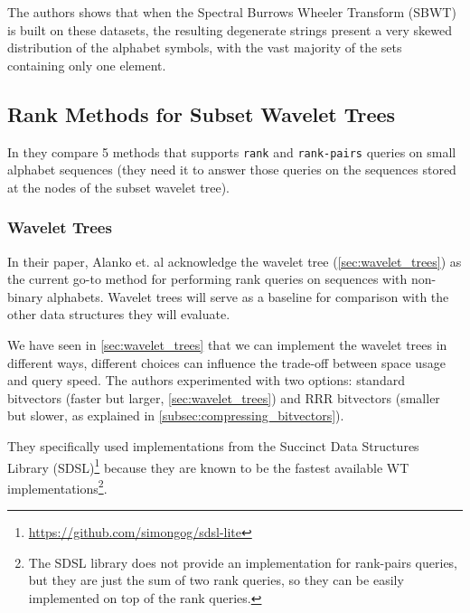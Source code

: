 \noindent The authors shows that when the Spectral Burrows Wheeler Transform (SBWT) is built on these datasets, the resulting degenerate strings present a very skewed distribution of the alphabet symbols, with the vast majority of the sets containing only one element.

\subsection{Rank Methods for Subset Wavelet Trees} \label{sec:rank_succint_datastructures}
In \cite{SubsetWT} they compare 5 methods that supports \texttt{rank} and \texttt{rank-pairs} queries on small alphabet sequences (they need it to answer those queries on the sequences stored at the nodes of the subset wavelet tree).

\subsubsection{Wavelet Trees}

In their paper, Alanko et. al acknowledge the wavelet tree (\autoref{sec:wavelet_trees}) as the current go-to method for performing rank queries on sequences with non-binary alphabets. Wavelet trees will serve as a baseline for comparison with the other data structures they will evaluate. \vspace{0.4cm}

\noindent We have seen in \autoref{sec:wavelet_trees} that we can implement the wavelet trees in different ways, different choices can influence the trade-off between space usage and query speed. The authors experimented with two options: standard bitvectors (faster but larger, \autoref{sec:wavelet_trees}) and RRR bitvectors (smaller but slower, as explained in \autoref{subsec:compressing_bitvectors}). \vspace{0.4cm}

\noindent They specifically used implementations from the Succinct Data Structures Library (SDSL)\footnote{\url{https://github.com/simongog/sdsl-lite}} because they are known to be the fastest available WT implementations\footnote{The SDSL library does not provide an implementation for rank-pairs queries, but they are just the sum of two rank queries, so they can be easily implemented on top of the rank queries.}. \vspace{0.4cm}

 \vspace{0.4cm}

